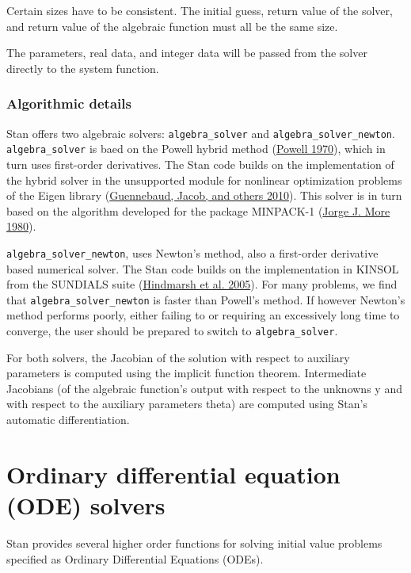 \documentclass[
  10pt,
]{book}
\begin{document}
Certain sizes have to be consistent. The initial guess, return value
of the solver, and return value of the algebraic function must all be
the same size.

The parameters, real data, and integer data will be passed from the
solver directly to the system function.

\hypertarget{algorithmic-details}{%
\subsubsection{Algorithmic details}\label{algorithmic-details}}

Stan offers two algebraic solvers: \texttt{algebra\_solver} and \texttt{algebra\_solver\_newton}.
\texttt{algebra\_solver} is baed on the Powell hybrid method (\protect\hyperlink{ref-Powell:1970}{Powell 1970}),
which in turn uses first-order derivatives. The Stan code builds on
the implementation of the hybrid solver in the unsupported module for
nonlinear optimization problems of the Eigen library (\protect\hyperlink{ref-Eigen:2013}{Guennebaud, Jacob, and others 2010}).
This solver is in turn based on the algorithm developed for the
package MINPACK-1 (\protect\hyperlink{ref-minpack:1980}{Jorge J. More 1980}).

\texttt{algebra\_solver\_newton}, uses Newton's method,
also a first-order derivative based numerical solver.
The Stan code builds on the implementation in KINSOL
from the SUNDIALS suite (\protect\hyperlink{ref-Hindmarsh:2005}{Hindmarsh et al. 2005}).
For many problems, we find that \texttt{algebra\_solver\_newton} is faster
than Powell's method.
If however Newton's method performs poorly, either failing to or requiring an excessively
long time to converge, the user should be prepared to switch
to \texttt{algebra\_solver}.

For both solvers, the Jacobian of the solution
with respect to auxiliary parameters is
computed using the implicit function theorem. Intermediate Jacobians
(of the algebraic function's output with respect to the unknowns y
and with respect to the auxiliary parameters theta) are computed using
Stan's automatic differentiation.

\hypertarget{functions-ode-solver}{%
\section{Ordinary differential equation (ODE) solvers}\label{functions-ode-solver}}

Stan provides several higher order functions for solving initial value
problems specified as Ordinary Differential Equations (ODEs).
\end{document}
